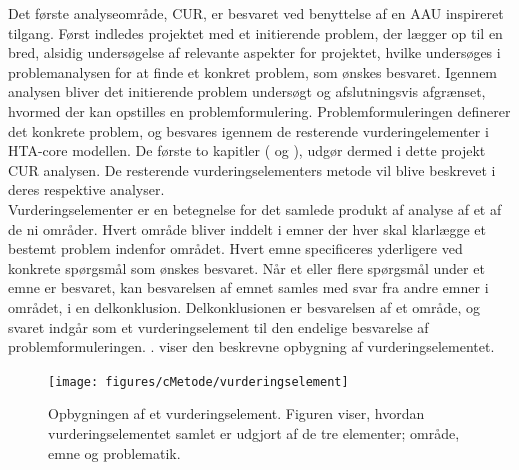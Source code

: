 Det første analyseområde, CUR, er besvaret ved benyttelse af en AAU inspireret tilgang. Først indledes projektet med et initierende problem, der lægger op til en bred, alsidig undersøgelse af relevante aspekter for projektet, hvilke undersøges i problemanalysen for at finde et konkret problem, som ønskes besvaret. Igennem analysen bliver det initierende problem undersøgt og afslutningsvis afgrænset, hvormed der kan opstilles en problemformulering. Problemformuleringen definerer det konkrete problem, og besvares igennem de resterende vurderingelementer i HTA-core modellen. De første to kapitler ( og ), udgør dermed i dette projekt CUR analysen. De resterende vurderingselementers metode vil blive beskrevet i deres respektive analyser. \\	
Vurderingselementer er en betegnelse for det samlede produkt af analyse af et af de ni områder. Hvert område bliver inddelt i emner der hver skal klarlægge et bestemt problem indenfor området. Hvert emne specificeres yderligere ved konkrete spørgsmål som ønskes besvaret. Når et eller flere spørgsmål under et emne er besvaret, kan besvarelsen af emnet samles med svar fra andre emner i området, i en delkonklusion. Delkonklusionen er besvarelsen af et område, og svaret indgår som et vurderingselement til den endelige besvarelse af problemformuleringen.  \citep{HTAcore}.  viser den beskrevne opbygning af vurderingselementet. 


\begin{figure}[H] 
\begin{center}
\texttt{[image: figures/cMetode/vurderingselement]}
\end{center}
\caption{Opbygningen af et vurderingselement. Figuren viser, hvordan vurderingselementet samlet er udgjort af de tre elementer; område, emne og problematik.}
\label{fig:vurderingselement} 
\end{figure}

